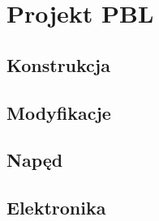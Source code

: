 \chapter{Projekt PBL}

\section{Konstrukcja}

\section{Modyfikacje}

\section{Napęd}

\section{Elektronika}